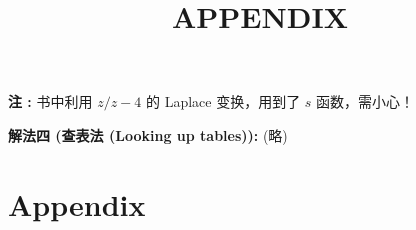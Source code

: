\documentclass[linespread=1.5,openany]{book}%
\theoremstyle{plain}
\begin{document}
{{{{{{{									
									\textbf{注 :} 书中利用 $z/z-4$ 的 Laplace 变换，用到了 $s$ 函数，需小心！
									\vspace{\baselineskip}
									
									\noindent\textbf{解法四 (查表法 (Looking up tables)):} (略)
									
									
									
								} %
								
								
								
								
								
								
							} %
							
							
						
							\part{Appendix}{%
								\newpage
								{\appendix %
									\title{\begin{center}
											\Huge{\textbf{APPENDIX}}\end{center}}
}}}}}}}
\end{document}
